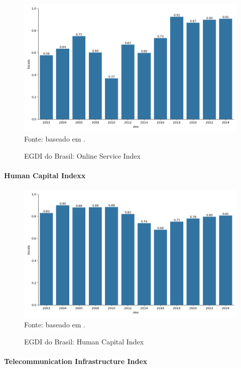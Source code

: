 \begin{figure}[H]
	\centering
	\caption{EGDI do Brasil: Online Service Index}
	\includegraphics[width=1\linewidth]{figuras/egdi/egdi_brasil_osi.png}
	\label{fig:egdi_brasil_osi}
	\footnotesize{Fonte: baseado em \cite{ONU_edgi_mapa}.}
\end{figure}

\paragraph{Human Capital Indexx}

\begin{figure}[H]
	\centering
	\caption{EGDI do Brasil: Human Capital Index}
	\includegraphics[width=1\linewidth]{figuras/egdi/egdi_brasil_hci.png}
	\label{fig:egdi_brasil_hci}
	\footnotesize{Fonte: baseado em \cite{ONU_edgi_mapa}.}
\end{figure}

\paragraph{Telecommunication Infrastructure Index}

